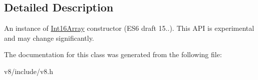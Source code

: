 \subsection{Detailed Description}
An instance of \hyperlink{classv8_1_1Int16Array}{Int16\+Array} constructor (E\+S6 draft 15..). This A\+P\+I is experimental and may change significantly. 

The documentation for this class was generated from the following file\+:\begin{DoxyCompactItemize}
\item 
v8/include/v8.\+h\end{DoxyCompactItemize}
